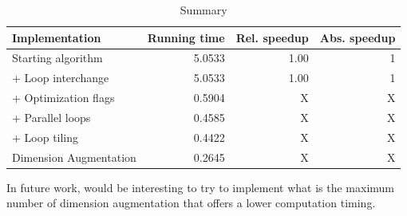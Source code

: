 \documentclass[conference]{IEEEtran}
\begin{document}
\renewcommand{\tablename}{Table}

\begin{table}[h!]
\begin{tabular}{||l r r r||} 
\hline
 Implementation & Running time & Rel. speedup & Abs. speedup \\ [0.5ex] 
 \hline\hline
 Starting algorithm & 5.0533 & 1.00 & 1 \\
 + Loop interchange & 5.0533 & 1.00 & 1 \\
 + Optimization flags & 0.5904 & X & X \\
 + Parallel loops & 0.4585 & X & X \\
 + Loop tiling & 0.4422 & X & X \\
 Dimension Augmentation & 0.2645 & X & X \\ [1ex] 
\hline
\end{tabular}
\caption{Summary}
\label{table:optimization-summary}
\end{table}

In future work, would be interesting to try to implement what is the maximum number of dimension augmentation that offers a lower computation timing.
\end{document}
